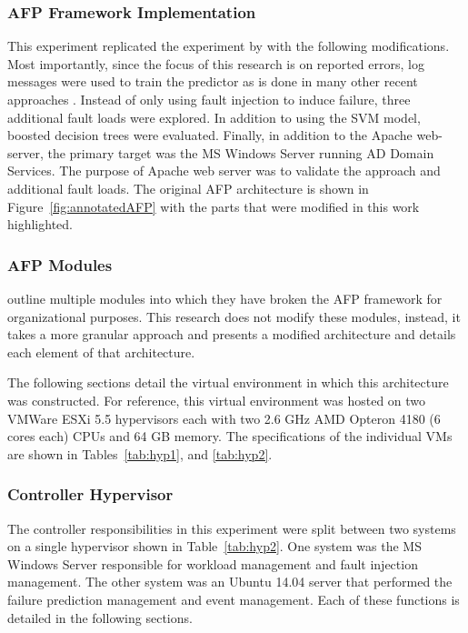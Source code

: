 \subsubsection{\ac{AFP} Framework Implementation}
This experiment replicated the experiment by \citet{irrera2015} with the
following modifications.  Most importantly, since the focus of this research is
on reported errors, log messages were used to train the predictor as is done in
many other recent approaches
\citep{domeniconi2002,fulp2008,salfner2007,watanabe2014}.  Instead of only
using fault injection to induce failure, three additional fault loads were
explored.  In addition to using the \ac{SVM} model, boosted decision trees were
evaluated.  Finally, in addition to the Apache web-server, the primary target
was the \ac{MS} Windows Server running \ac{AD} Domain Services.  The purpose of
Apache web server was to validate the approach and additional fault loads.  The
original \ac{AFP} architecture is shown in Figure~\ref{fig:annotatedAFP} with
the parts that were modified in this work highlighted.  

\subsubsection{\ac{AFP} Modules}
\citet{irrera2015} outline multiple modules into which they have broken the
\ac{AFP} framework for organizational purposes.  This research does not modify
these modules, instead, it takes a more granular approach and presents a
modified architecture and details each element of that architecture.

\figannotatedAFP

The following sections detail the virtual environment in which this
architecture was constructed.  For reference, this virtual environment was
hosted on two VMWare ESXi 5.5 hypervisors each with two 2.6 \ac{GHz} AMD
Opteron 4180 (6 cores each) \ac{CPU}s and 64 \ac{GB} memory.  The
specifications of the individual \ac{VM}s are shown in Tables~\ref{tab:hyp1},
and \ref{tab:hyp2}.

\tabHypervisorOne
\tabHypervisorTwo

\setcounter{secnumdepth}{5}

\subsubsection{Controller Hypervisor} \label{sec:controller} %
The controller responsibilities in this experiment were split between two
systems on a single hypervisor shown in Table~\ref{tab:hyp2}.  One system was
the \ac{MS} Windows Server responsible for workload management and fault
injection management.  The other system was an Ubuntu 14.04 server that
performed the failure prediction management and event management.  Each of
these functions is detailed in the following sections.

